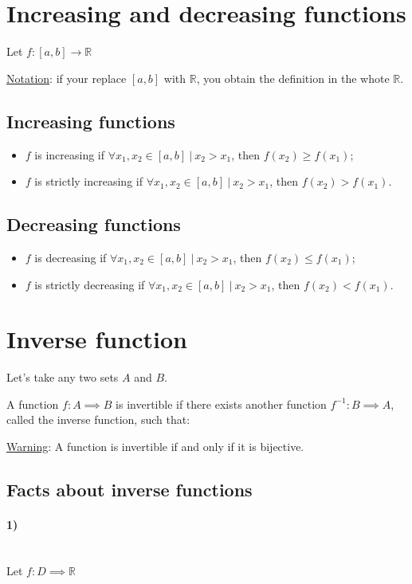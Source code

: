\documentclass{article}
\newcommand{\figbox}[1]{ 
    \begin{figure*}[ht!]        
        \begin{center}            
            \fbox{#1}        
        \end{center}    
    \end{figure*}
}
\newcommand{\nots}{\underline{Notation}: }
\newcommand{\wrn}{\underline{Warning}: }
\newcommand{\sht}{\ |\ }
\newcommand{\pph}[1]{\paragraph{#1} \phantom{}\\}
\begin{document}
\newpage
\section{Increasing and decreasing functions}
Let $f:[a,b] \longrightarrow \mathbb{R}$

\nots{if your replace $[a,b]$ with $\mathbb{R}$, you obtain the definition in the whote $\mathbb{R}$.}

\subsection{Increasing functions}
\begin{itemize}
    \item $f$ is increasing if $\forall x_1,x_2 \in [a,b] \sht x_2>x_1$, then $f(x_2)\geq f(x_1)$;
    \item $f$ is strictly increasing if $\forall x_1,x_2 \in [a,b] \sht x_2>x_1$, then $f(x_2)>f(x_1)$.
\end{itemize}

\subsection{Decreasing functions}
\begin{itemize}
    \item $f$ is decreasing if $\forall x_1,x_2 \in [a,b] \sht x_2>x_1$, then $f(x_2)\leq f(x_1)$;
    \item $f$ is strictly decreasing if $\forall x_1,x_2 \in [a,b] \sht x_2>x_1$, then $f(x_2)<f(x_1)$.
\end{itemize}

\section{Inverse function}
Let's take any two sets $A$ and $B$.

A function $f: A \implies B$ is invertible if there exists another
function $f^{-1}: B \implies A$, called the inverse function, such that:

\figbox{\begin{minipage}{3.6cm}
    $\forall x \in A,\ f^{-1}(f(x)) = x$ \vspace*{-.25cm}\\
    $\forall y \in B,\ f(f^{-1}(y)) = y$
\end{minipage}}

\wrn{A function is invertible if and only if it is bijective.}

\subsection{Facts about inverse functions}
\pph{1)}
Let $f:D\implies \mathbb{R}$
\end{document}
